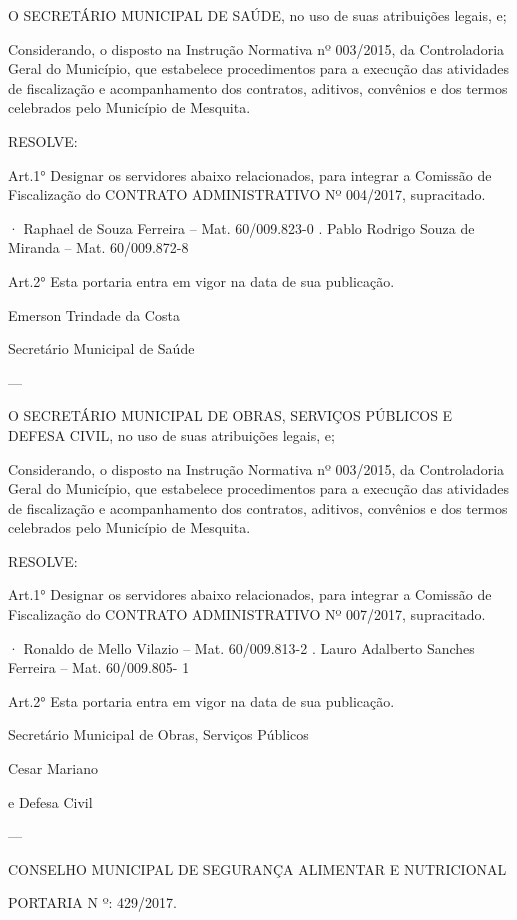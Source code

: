 \documentclass{doliberto}
\begin{document}
O  SECRETÁRIO  MUNICIPAL  DE  SAÚDE,  no  uso  de  suas 
atribuições legais, e; 
 
Considerando,  o  disposto  na  Instrução  Normativa  nº 
003/2015,  da  Controladoria  Geral  do  Município,  que 
estabelece  procedimentos  para  a  execução  das  atividades 
de  fiscalização  e  acompanhamento  dos  contratos,  aditivos, 
convênios  e  dos  termos  celebrados  pelo  Município  de 
Mesquita. 
 
RESOLVE: 
 
Art.1°  Designar  os  servidores  abaixo  relacionados,  para 
integrar  a  Comissão  de  Fiscalização  do  CONTRATO 
ADMINISTRATIVO Nº 004/2017, supracitado. 
 
· Raphael de Souza Ferreira – Mat. 60/009.823-0 
. Pablo Rodrigo Souza de Miranda – Mat. 60/009.872-8 
 
Art.2°  Esta  portaria  entra  em  vigor  na  data  de  sua 
publicação.  
 

Emerson Trindade da Costa 

Secretário Municipal de Saúde 

---

O  SECRETÁRIO  MUNICIPAL  DE  OBRAS,  SERVIÇOS 
PÚBLICOS  E  DEFESA  CIVIL,  no  uso  de  suas  atribuições 
legais, e; 
 
Considerando,  o  disposto  na  Instrução  Normativa  nº 
003/2015,  da  Controladoria  Geral  do  Município,  que 
estabelece  procedimentos  para  a  execução  das  atividades 
de  fiscalização  e  acompanhamento  dos  contratos,  aditivos, 
convênios  e  dos  termos  celebrados  pelo  Município  de 
Mesquita. 
 
RESOLVE: 
 
Art.1°  Designar  os  servidores  abaixo  relacionados,  para 
integrar  a  Comissão  de  Fiscalização  do  CONTRATO 
ADMINISTRATIVO Nº 007/2017, supracitado. 
 
· Ronaldo de Mello Vilazio – Mat. 60/009.813-2 
. Lauro Adalberto Sanches Ferreira – Mat. 60/009.805-
1 
 
Art.2°  Esta  portaria  entra  em  vigor  na  data  de  sua 
publicação. 
 

Secretário Municipal de Obras, Serviços Públicos 

Cesar Mariano 

e Defesa Civil

---

CONSELHO  MUNICIPAL  DE  SEGURANÇA  ALIMENTAR  E 
NUTRICIONAL 

PORTARIA N º: 429/2017.      
\end{document}

